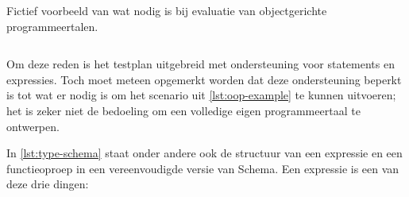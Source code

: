 \begin{listing}[h]
    \caption{Fictief voorbeeld van wat nodig is bij evaluatie van objectgerichte programmeertalen.}
    \label{lst:oop-example}
    \inputminted{java}{code/assignment.jshell}
\end{listing}

Om deze reden is het testplan uitgebreid met ondersteuning voor statements en expressies.
Toch moet meteen opgemerkt worden dat deze ondersteuning beperkt is tot wat er nodig is om het scenario uit \cref{lst:oop-example} te kunnen uitvoeren;
het is zeker niet de bedoeling om een volledige eigen programmeertaal te ontwerpen.

In \cref{lst:type-schema} staat onder andere ook de structuur van een expressie en een functieoproep in een vereenvoudigde versie van  Schema.
Een expressie is een van deze drie dingen:
